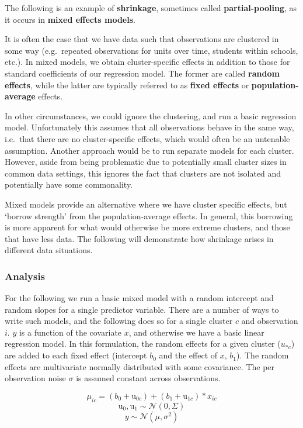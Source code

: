 \documentclass[
  12pt,
]{book}
\begin{document}
The following is an example of \textbf{shrinkage}, sometimes called \textbf{partial-pooling}, as it occurs in \textbf{mixed effects models}.

It is often the case that we have data such that observations are clustered in some way (e.g.~repeated observations for units over time, students within schools, etc.). In mixed models, we obtain cluster-specific effects in addition to those for standard coefficients of our regression model. The former are called \textbf{random effects}, while the latter are typically referred to as \textbf{fixed effects} or \textbf{population-average} effects.

In other circumstances, we could ignore the clustering, and run a basic regression model. Unfortunately this assumes that all observations behave in the same way, i.e.~that there are no cluster-specific effects, which would often be an untenable assumption. Another approach would be to run separate models for each cluster. However, aside from being problematic due to potentially small cluster sizes in common data settings, this ignores the fact that clusters are not isolated and potentially have some commonality.

Mixed models provide an alternative where we have cluster specific effects, but `borrow strength' from the population-average effects. In general, this borrowing is more apparent for what would otherwise be more extreme clusters, and those that have less data. The following will demonstrate how shrinkage arises in different data situations.

\hypertarget{analysis}{%
\subsubsection{Analysis}\label{analysis}}

For the following we run a basic mixed model with a random intercept and random slopes for a single predictor variable. There are a number of ways to write such models, and the following does so for a single cluster \(c\) and observation \(i\). \(y\) is a function of the covariate \(x\), and otherwise we have a basic linear regression model. In this formulation, the random effects for a given cluster (\(u_{* c}\)) are added to each fixed effect (intercept \(b_0\) and the effect of \(x\), \(b_1\)). The random effects are multivariate normally distributed with some covariance. The per observation noise \(\sigma\) is assumed constant across observations.

\[\mu_{ic} = (b_0 + \mathrm{u}_{0c})+ (b_1+\mathrm{u}_{1c}) * x_{ic}\]
\[\mathrm{u}_{0}, \mathrm{u}_{1} \sim \mathcal{N}(0, \Sigma)\]
\[y \sim \mathcal{N}(\mu, \sigma^2)\]
\end{document}
